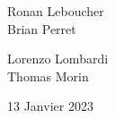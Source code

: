 \begin{titlepage}
\begin{sffamily}
\begin{center}
    \begin{minipage}{0.4\textwidth}
      \begin{flushleft} \large
        Ronan Leboucher\\
        Brian Perret\\
      \end{flushleft}
    \end{minipage}
    \begin{minipage}{0.4\textwidth}
      \begin{flushright} \large
        Lorenzo Lombardi\\
        Thomas Morin\\
      \end{flushright}
    \end{minipage}

    \vfill

    {\large 13 Janvier 2023}

  \end{center}
  \end{sffamily}
\end{titlepage}
